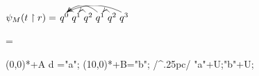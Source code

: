 \documentclass{article}
\begin{document}
$\psi_M(t\upharpoonright r) =
\xymatrix@1@=0pt @C=1pt @R=0pt {
q^0 & q^1 \ar@/_2pt/+U-(1,0);[l]+U+(1,0) & 
q^2 \ar@/_2pt/+U-(1,0);[l]+U+(1,0) &
 q^1 \ar@/_7pt/+U-(1,0);[lll]+U+(1,0) &
 q^2 \ar@/_2pt/+U-(1,0);[l]+U+(1,0)& 
q^3 \ar@/_7pt/+U-(1,0);[lllll]+U+(1,0) \\
}$

 \qquad = \qquad
  \quad 

\xy %
(0,0)*+{A d {} }="a";
 (10,0)*+{B}="b";
{\ar@/^.25pc/ "a"+U;"b"+U};
\endxy
\end{document}
